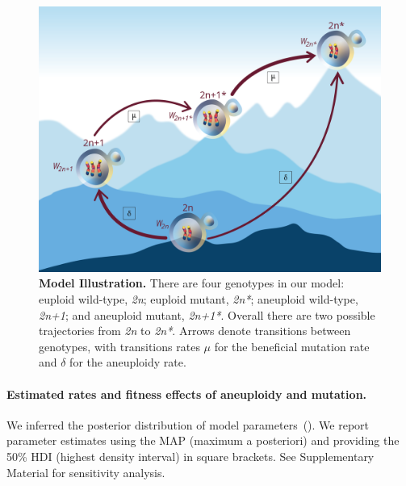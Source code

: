\documentclass[12pt]{extarticle}
\newcommand{\euwt}{\emph{2n}}
\newcommand{\anwt}{\emph{2n+1}}
\newcommand{\eumt}{\emph{2n*}}
\newcommand{\anmt}{\emph{2n+1*}}
\begin{document}
\begin{figure}[t]
  \centering
    \includegraphics[width=\textwidth]{../figures/Fig1-A.png}      
  \caption{
    \textbf{Model Illustration.}
    There are four genotypes in our model: euploid wild-type, \euwt; euploid mutant, \eumt; aneuploid wild-type, \anwt; and aneuploid mutant, \anmt.
    Overall there are two possible trajectories from \euwt\; to \eumt.
    Arrows denote transitions between genotypes, with transitions rates $\mu$ for the beneficial mutation rate and $\delta$ for the aneuploidy rate.
   }
  \label{fig:models}
\end{figure}


\paragraph{Estimated rates and fitness effects of aneuploidy and mutation.} 
We inferred the posterior distribution of model parameters~(). 
We report parameter estimates using the MAP (maximum a posteriori) and providing the 50\% HDI (highest density interval) in square brackets. See Supplementary Material for sensitivity analysis.
\end{document}
